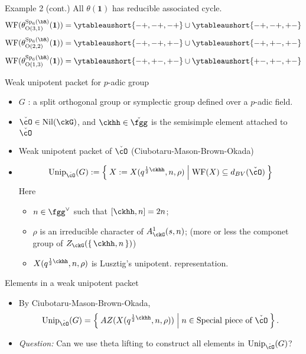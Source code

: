 \documentclass[t,mathserif,11pt]{beamer}
\theoremstyle{plain}
\theoremstyle{definition}
\newcommand{\rO}{\mathrm{O}}
\newcommand{\bfone}{\mathbf{1}}
\DeclareMathOperator{\WF}{WF}
\def\Sp{{\mathrm{Sp}}}
\def\Unip{{\mathrm{Unip}}}
\def\half{{\frac{1}{2}}}
\def\ckcO{{\check{\cO}}}
\def\ckfgg{{\check{\fgg}}}
\def\Nil{\mathrm{Nil}}
\def\blue{\color{blue}}
\let\oldemph\emph
\def\emph#1{\oldemph{\blue #1}}
\let\ytb=\ytableaushort
\def\dBV{d_{BV}}
\begin{document}
  \begin{frame}{Example 2 (cont.)}
      All $\theta(\bfone)$ has reducible associated cycle. 
      \[
      \WF(\theta_{\rO(3,1)}^{\Sp_6(\bR)}(\bfone)) = 
      \ytb{
        -+, -+, -+ } \cup \ytb{ -+, -+, +- }
      \] 
      \[
      \WF(\theta_{\rO(2,2)}^{\Sp_6(\bR)}(\bfone)) = 
      \ytb{
        -+, -+, +- } \cup \ytb{ -+, +-, +- }
      \] 
      \[
      \WF(\theta_{\rO(1,3)}^{\Sp_6(\bR)}(\bfone)) = 
      \ytb{
        -+, +-, +- } \cup \ytb{ +-, +-, +- }
      \] 
  \end{frame}  
  \begin{frame}{Weak unipotent packet for $p$-adic group }
    \begin{itemize}
    \item $G$ : a split orthogonal group or symplectic group  defined over a $p$-adic field. 
    \item $\ckcO \in \Nil(\ckG)$, and $\ckhh \in \ckfgg$ is the semisimple element attached to $\ckcO$ \pause
    \item Weak unipotent packet of $\ckcO$ (Ciubotaru-Mason-Brown-Okada) 
    \item[] 
    \[
      \Unip_\ckcO(G):= \Set{X := X(q^{\half\ckhh},n, \rho) | 
    \WF(X) \subseteq \dBV(\ckcO)}
    \] 
    Here 
    \begin{itemize}
    \item $n\in \fgg^\vee$ such that $[\ckhh,n] = 2n$; 
    \item $\rho$ is an irreducible character of $A^1_{\ckG}(s,n)$;
    (more or less the componet group of $Z_\ckG(\set{\ckhh,n})$)  
    \item $X(q^{\half\ckhh},n, \rho)$ is Lusztig's unipotent. representation. 
    \end{itemize}
    \end{itemize}
  \end{frame}

  \def\AZ{\mathrm{AZ}}

  \begin{frame}{Elements in a weak unipotent packet}
    \begin{itemize}
      \item By Ciubotaru-Mason-Brown-Okada, 
      \[ 
      \Unip_\ckcO(G) = \Set{AZ(X(q^{\half \ckhh},n,\rho))| n \in \text{Special piece of $\ckcO$}}.  
      \]
      \item \pause\emph{Question:} Can we use theta lifting to construct all elements in $\Unip_\ckcO(G)$? 
    \end{itemize}
  \end{frame}
\end{document}
